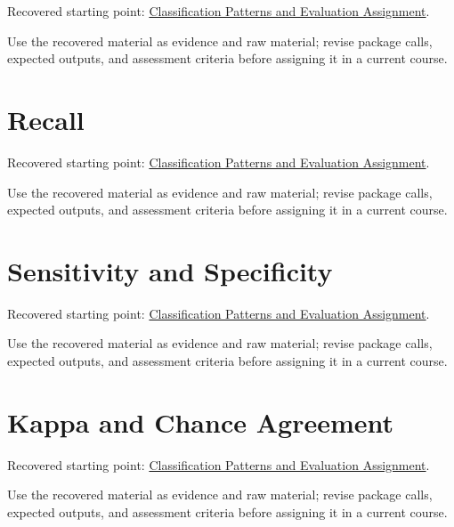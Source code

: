 \documentclass[
  letterpaper,
]{scrbook}
\begin{document}
Recovered starting point:
\hyperref[sec-lab-classification-patterns-assignment]{Classification
Patterns and Evaluation Assignment}.

Use the recovered material as evidence and raw material; revise package
calls, expected outputs, and assessment criteria before assigning it in
a current course.

\section*{Recall}\label{sec-pr-14-recall}


Recovered starting point:
\hyperref[sec-lab-classification-patterns-assignment]{Classification
Patterns and Evaluation Assignment}.

Use the recovered material as evidence and raw material; revise package
calls, expected outputs, and assessment criteria before assigning it in
a current course.

\section*{Sensitivity and
Specificity}\label{sec-pr-14-sensitivity-and-specificity}


Recovered starting point:
\hyperref[sec-lab-classification-patterns-assignment]{Classification
Patterns and Evaluation Assignment}.

Use the recovered material as evidence and raw material; revise package
calls, expected outputs, and assessment criteria before assigning it in
a current course.

\section*{Kappa and Chance
Agreement}\label{sec-pr-14-kappa-and-chance-agreement}


Recovered starting point:
\hyperref[sec-lab-classification-patterns-assignment]{Classification
Patterns and Evaluation Assignment}.

Use the recovered material as evidence and raw material; revise package
calls, expected outputs, and assessment criteria before assigning it in
a current course.
\end{document}
